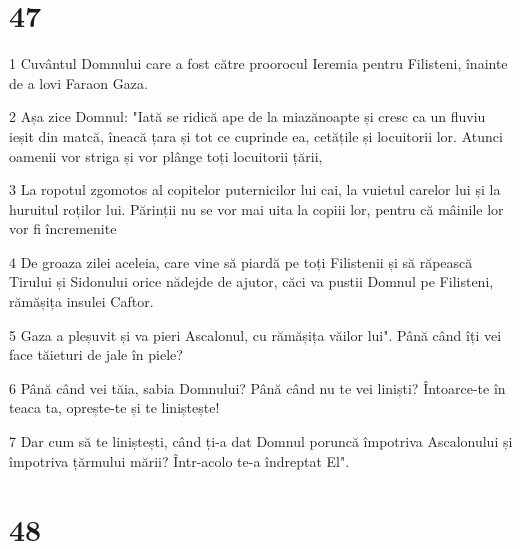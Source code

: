 \chapter{47}

\par 1 Cuvântul Domnului care a fost către proorocul Ieremia pentru Filisteni, înainte de a lovi Faraon Gaza.
\par 2 Așa zice Domnul: "Iată se ridică ape de la miazănoapte și cresc ca un fluviu ieșit din matcă, îneacă țara și tot ce cuprinde ea, cetățile și locuitorii lor. Atunci oamenii vor striga și vor plânge toți locuitorii țării,
\par 3 La ropotul zgomotos al copitelor puternicilor lui cai, la vuietul carelor lui și la huruitul roților lui. Părinții nu se vor mai uita la copiii lor, pentru că mâinile lor vor fi încremenite
\par 4 De groaza zilei aceleia, care vine să piardă pe toți Filistenii și să răpească Tirului și Sidonului orice nădejde de ajutor, căci va pustii Domnul pe Filisteni, rămășița insulei Caftor.
\par 5 Gaza a pleșuvit și va pieri Ascalonul, cu rămășița văilor lui". Până când îți vei face tăieturi de jale în piele?
\par 6 Până când vei tăia, sabia Domnului? Până când nu te vei liniști? Întoarce-te în teaca ta, oprește-te și te liniștește!
\par 7 Dar cum să te liniștești, când ți-a dat Domnul poruncă împotriva Ascalonului și împotriva țărmului mării? Într-acolo te-a îndreptat El".

\chapter{48}

